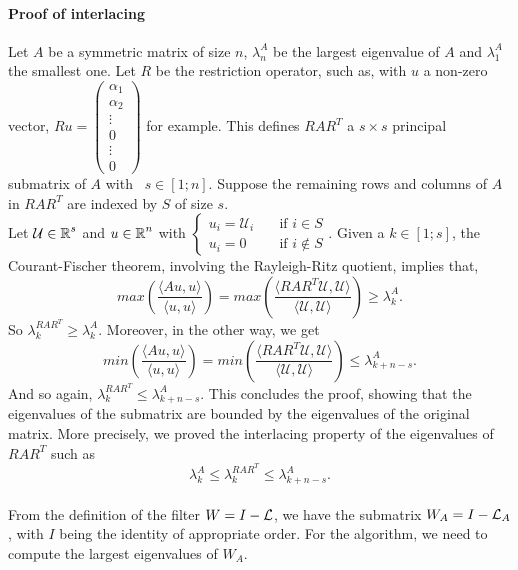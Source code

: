 \paragraph{Proof of interlacing}
Let \(A\) be a symmetric matrix of size \(n\), \(\lambda^A_n\) be the largest eigenvalue of \(A\) and \(\lambda^A_1\) the smallest one.
Let \(R\) be the restriction operator, such as, with \(u\) a non-zero vector, \(Ru = \begin{pmatrix}\alpha_1 \\ \alpha_2 \\ \vdots \\ 0 \\ \vdots \\ 0 \end{pmatrix}\) for example.
This defines \(RAR^T\) a \(s \times s\) principal submatrix of \(A\) with  \(s \in [1; n]\).
Suppose the remaining rows and columns of \(A\) in \(RAR^T\) are indexed by \(S\) of size \(s\). \\
Let \(\mathcal{U} \in \operatorname{\mathbb{R}}^s\) and \(u \in \operatorname{\mathbb{R}}^n\) with \(\begin{cases} u_i = \mathcal{U}_i & \quad \text{if } i \in S \\ u_i = 0 & \quad \text{if } i \notin S \end{cases}\).
Given a \(k \in [1; s]\), the Courant-Fischer theorem, involving the Rayleigh-Ritz quotient, implies that,
\[max\left(\frac{\langle Au, u \rangle}{\langle u, u\rangle}\right) = max\left(\frac{\langle RAR^T\mathcal{U}, \mathcal{U}\rangle}{\langle \mathcal{U}, \mathcal{U} \rangle}\right) \ge \lambda^A_k.\]
So \(\lambda^{RAR^T}_k \ge \lambda^A_k\).
Moreover, in the other way, we get
\[min\left(\frac{\langle Au, u \rangle}{\langle u, u\rangle}\right) = min\left(\frac{\langle RAR^T\mathcal{U}, \mathcal{U}\rangle}{\langle \mathcal{U}, \mathcal{U} \rangle}\right) \le \lambda^A_{k+n-s}.\]
And so again, \(\lambda^{RAR^T}_k \le \lambda^A_{k+n-s}\).
This concludes the proof, showing that the eigenvalues of the submatrix are bounded by the eigenvalues of the original matrix.
More precisely, we proved the interlacing property of the eigenvalues of \(RAR^T\) such as
\[\lambda^A_k \le \lambda^{RAR^T}_k \le \lambda^A_{k+n-s}.\]

\paragraph{}
From the definition of the filter \(W = I - \operatorname{\mathcal{L}}\), we have the submatrix \(W_A = I - \operatorname{\mathcal{L}}_A\), with \(I\) being the identity of appropriate order.
For the algorithm, we need to compute the largest eigenvalues of \(W_A\).

